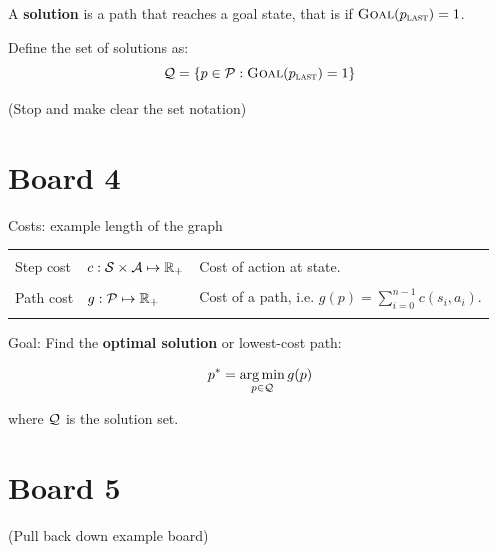\documentclass[10pt]{article}
\begin{document}
\begin{defn}
  A \textbf{solution} is a path that reaches a goal state, that is if $\mathrm{\textsc{Goal}}(p_{\mathrm{\textsc{last}}}) = 1$.


  Define the set of solutions as: 
  \[\mathcal{Q} = \{p \in \mathcal{P}:  \mathrm{\textsc{Goal}}(p_{\mathrm{\textsc{last}}}) = 1 \} \]
\end{defn}

(Stop and make clear the set notation)

\section{Board 4}

Costs: example length of the graph

\air

\begin{center}
\begin{tabularx}{\linewidth}{llX}
  \toprule
  \\
 Step cost & $c:\mathcal{S} \times \mathcal{A} \mapsto \mathbb{R}_+$ & Cost of action at state. \\\\
 Path cost & $g:\mathcal{P}  \mapsto \mathbb{R}_+$ & Cost of a path, i.e. $g(p) = \sum_{i=0}^{n-1}  c(s_i, a_i)$. \\\\
\bottomrule
\end{tabularx}
\end{center}

Goal: Find the \textbf{optimal solution} or lowest-cost path:

\[ p^* = \argmin_{p \in \mcQ} g(p) \] 

\noindent where $\mathcal{Q}$ is the solution set. 


\section{Board 5}

(Pull back down example board)
\end{document}
